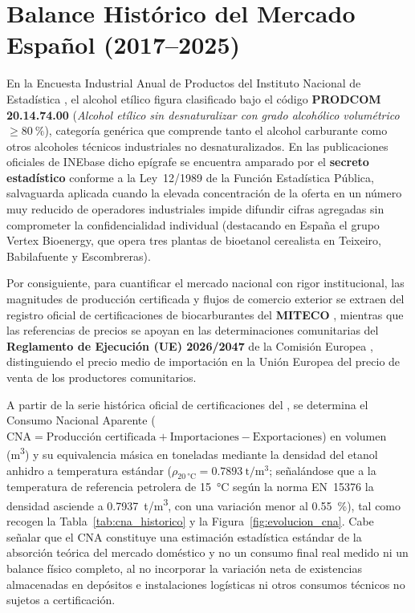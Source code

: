 \documentclass{report}
\begin{document}
\section{Balance Histórico del Mercado Español (2017--2025)}
En la Encuesta Industrial Anual de Productos del Instituto Nacional de Estadística \autocite{INE2025}, el alcohol etílico figura clasificado bajo el código \textbf{PRODCOM 20.14.74.00} (\textit{Alcohol etílico sin desnaturalizar con grado alcohólico volumétrico $\ge \SI{80}{\percent}$}), categoría genérica que comprende tanto el alcohol carburante como otros alcoholes técnicos industriales no desnaturalizados. En las publicaciones oficiales de INEbase dicho epígrafe se encuentra amparado por el \textbf{secreto estadístico} conforme a la Ley~12/1989 de la Función Estadística Pública, salvaguarda aplicada cuando la elevada concentración de la oferta en un número muy reducido de operadores industriales impide difundir cifras agregadas sin comprometer la confidencialidad individual (destacando en España el grupo Vertex Bioenergy, que opera tres plantas de bioetanol cerealista en Teixeiro, Babilafuente y Escombreras).

Por consiguiente, para cuantificar el mercado nacional con rigor institucional, las magnitudes de producción certificada y flujos de comercio exterior se extraen del registro oficial de certificaciones de biocarburantes del \textbf{MITECO} \autocite{MITECO2026}, mientras que las referencias de precios se apoyan en las determinaciones comunitarias del \textbf{Reglamento de Ejecución (UE) 2026/2047} de la Comisión Europea \autocite[Considerandos~8 y~11]{DOUE2026}, distinguiendo el precio medio de importación en la Unión Europea del precio de venta de los productores comunitarios.

A partir de la serie histórica oficial de certificaciones del \textcite{MITECO2026}, se determina el Consumo Nacional Aparente ($\text{CNA} = \text{Producción certificada} + \text{Importaciones} - \text{Exportaciones}$) en volumen (\si{\cubic\meter}) y su equivalencia másica en toneladas mediante la densidad del etanol anhidro a temperatura estándar ($\rho_{\SI{20}{\celsius}} = \SI{0.7893}{\tonne/\cubic\meter}$; señalándose que a la temperatura de referencia petrolera de \SI{15}{\celsius} según la norma EN~15376 la densidad asciende a \SI{0.7937}{\tonne/\cubic\meter}, con una variación menor al \SI{0.55}{\percent}), tal como recogen la Tabla~\ref{tab:cna_historico} y la Figura~\ref{fig:evolucion_cna}. Cabe señalar que el CNA constituye una estimación estadística estándar de la absorción teórica del mercado doméstico y no un consumo final real medido ni un balance físico completo, al no incorporar la variación neta de existencias almacenadas en depósitos e instalaciones logísticas ni otros consumos técnicos no sujetos a certificación.
\end{document}
